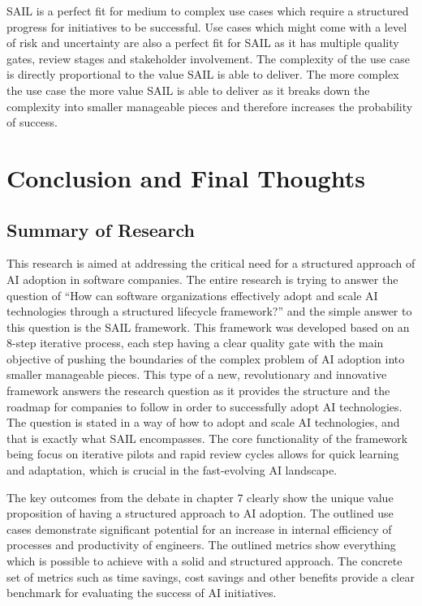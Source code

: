 \documentclass[]{imc-inf}
\begin{document}
SAIL is a perfect fit for medium to complex use cases which require a
structured progress for initiatives to be successful. Use cases which
might come with a level of risk and uncertainty are also a perfect fit
for SAIL as it has multiple quality gates, review stages and stakeholder
involvement. The complexity of the use case is directly proportional to
the value SAIL is able to deliver. The more complex the use case the
more value SAIL is able to deliver as it breaks down the complexity into
smaller manageable pieces and therefore increases the probability of
success.

\chapter{Conclusion and Final
	Thoughts}\label{chapter-8-conclusion-and-final-thoughts}

\section{Summary of Research}\label{summary-of-research}

This research is aimed at addressing the critical need for a structured
approach of AI adoption in software companies. The entire research is
trying to answer the question of ``How can software organizations
effectively adopt and scale AI technologies through a structured
lifecycle framework?'' and the simple answer to this question is the
SAIL framework. This framework was developed based on an 8-step
iterative process, each step having a clear quality gate with the main
objective of pushing the boundaries of the complex problem of AI
adoption into smaller manageable pieces. This type of a new,
revolutionary and innovative framework answers the research question as
it provides the structure and the roadmap for companies to follow in
order to successfully adopt AI technologies. The question is stated in a
way of how to adopt and scale AI technologies, and that is exactly what
SAIL encompasses. The core functionality of the framework being focus on
iterative pilots and rapid review cycles allows for quick learning and
adaptation, which is crucial in the fast-evolving AI landscape.

The key outcomes from the debate in chapter 7 clearly show the unique
value proposition of having a structured approach to AI adoption. The
outlined use cases demonstrate significant potential for an increase in
internal efficiency of processes and productivity of engineers. The
outlined metrics show everything which is possible to achieve with a
solid and structured approach. The concrete set of metrics such as time
savings, cost savings and other benefits provide a clear benchmark for
evaluating the success of AI initiatives.
\end{document}
